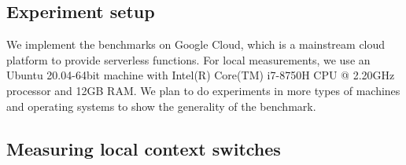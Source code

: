  
\subsection{Experiment setup}

We implement the benchmarks on Google Cloud, which is a mainstream cloud platform to provide serverless functions. 
For local measurements, we use an Ubuntu 20.04-64bit machine with Intel(R) Core(TM) i7-8750H CPU @ 2.20GHz processor and 12GB RAM.
We plan to do experiments in more types of machines and operating systems to show the generality of the benchmark.


\subsection{Measuring local context switches}




